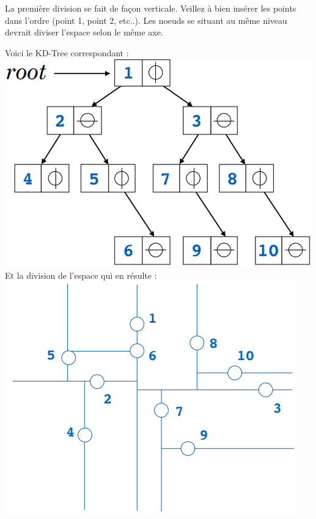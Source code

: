 \begin{Exercice}[5 minutes]
\begin{conseil}
La première division se fait de façon verticale. Veillez à bien insérer les points dans l'ordre (point 1, point 2, etc..). Les noeuds se situant au même niveau devrait diviser l'espace selon le même axe.
\end{conseil}
\begin{solution}
    Voici le KD-Tree correspondant :\\
    \includegraphics[]{Kd-tree.PNG}\\
    Et la division de l'espace qui en résulte :\\
    \includegraphics[]{Division espace.PNG}
\end{solution}
\end{Exercice}

\newpage

